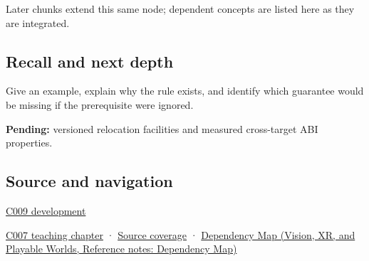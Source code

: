 Later chunks extend this same node; dependent concepts are listed here as they are integrated.

\subsection{Recall and next depth}\label{appendix-958870a64c53-recall-and-next-depth}

Give an example, explain why the rule exists, and identify which guarantee would be missing if the prerequisite were ignored.

\textbf{Pending:} versioned relocation facilities and measured cross-target ABI properties.

\subsection{Source and navigation}\label{appendix-958870a64c53-source-and-navigation}

\hyperref[appendix-fd090d982a15-m009---parts-127-147]{C009 development}

\hyperref[01-foundations-i-ch003-bringing-the-object-model-back-to-bytes]{C007 teaching chapter} · \hyperref[appendix-fd090d982a15-m007---parts-101-112]{Source coverage} · \href{../07-Vision-XR-and-Playable-Worlds/main.pdf\#nameddest=appendix-4ad47bdd269a}{Dependency Map (Vision, XR, and Playable Worlds, Reference notes: Dependency Map)}
